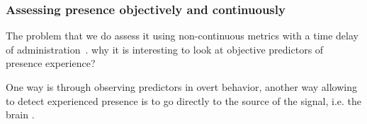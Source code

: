\subsubsection{Assessing presence objectively and continuously}
The problem that we do assess it using non-continuous metrics with a time delay of administration~\cite{Gehrke:2019:DVM:3290605.3300657}. why it is interesting to look at objective predictors of presence experience?

One way is through observing predictors in overt behavior, another way allowing to detect experienced presence is to go directly to the source of the signal, i.e. the brain \cite{Gehrke:2019:DVM:3290605.3300657}.
